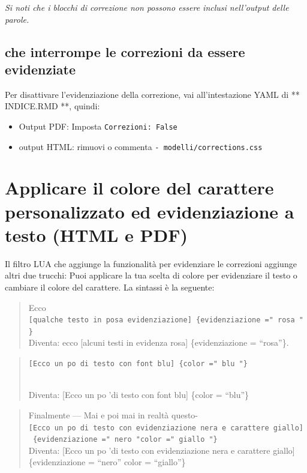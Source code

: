 \documentclass[a4paper, 11pt, nobind]{templates/ociamthesis}
\providecommand{\tightlist}{%
  \setlength{\itemsep}{0pt}\setlength{\parskip}{0pt}}
\begin{document}
\emph{Si noti che i blocchi di correzione non possono essere inclusi nell'output delle parole.}

\hypertarget{che-interrompe-le-correzioni-da-essere-evidenziate}{%
\subsection{che interrompe le correzioni da essere evidenziate}\label{che-interrompe-le-correzioni-da-essere-evidenziate}}

Per disattivare l'evidenziazione della correzione, vai all'intestazione YAML di ** INDICE.RMD **, quindi:

\begin{itemize}
\tightlist
\item
  Output PDF: Imposta \texttt{Correzioni:\ False}\\
\item
  output HTML: rimuovi o commenta \texttt{-\ modelli/corrections.css}
\end{itemize}

\hypertarget{applicare-il-colore-del-carattere-personalizzato-ed-evidenziazione-a-testo-html-e-pdf}{%
\section{Applicare il colore del carattere personalizzato ed evidenziazione a testo (HTML e PDF)}\label{applicare-il-colore-del-carattere-personalizzato-ed-evidenziazione-a-testo-html-e-pdf}}

Il filtro LUA che aggiunge la funzionalità per evidenziare le correzioni aggiunge altri due trucchi:
Puoi applicare la tua scelta di colore per evidenziare il testo o cambiare il colore del carattere.
La sintassi è la seguente:

\begin{quote}
Ecco \texttt{{[}qualche\ testo\ in\ posa\ evidenziazione{]}\ \{evidenziazione\ ="\ rosa\ "\}}\\
Diventa: ecco {[}alcuni testi in evidenza rosa{]} \{evidenziazione = ``rosa''\}.
\end{quote}

\begin{quote}
\texttt{{[}Ecco\ un\ po\ \textquotesingle{}di\ testo\ con\ font\ blu{]}\ \{color\ ="\ blu\ "\}}\strut \\
Diventa: {[}Ecco un po 'di testo con font blu{]} \{color = ``blu''\}
\end{quote}

\begin{quote}
Finalmente --- Mai e poi mai in realtà questo-\texttt{{[}Ecco\ un\ po\ \textquotesingle{}di\ testo\ con\ evidenziazione\ nera\ e\ carattere\ giallo{]}\ \{evidenziazione\ ="\ nero\ "color\ ="\ giallo\ "\}}\\
Diventa: {[}Ecco un po 'di testo con evidenziazione nera e carattere giallo{]} \{evidenziazione = ``nero'' color = ``giallo''\}
\end{quote}
\end{document}
